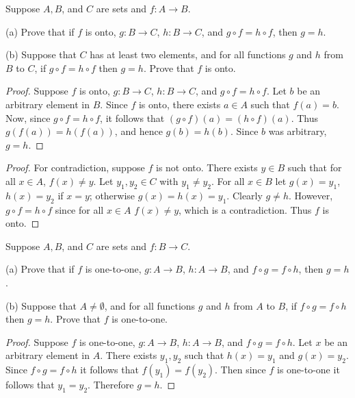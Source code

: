 \begin{tcolorbox}[title=Problem 20, breakable]
    Suppose $A, B$, and $C$ are sets and $f : A \rightarrow B$.

    (a) Prove that if $f$ is onto, $g : B \rightarrow C$, 
        $h : B \rightarrow C$, and $g \circ f = h \circ f$,
        then $g = h$.

    (b) Suppose that $C$ has at least two elements,
        and for all functions $g$ and $h$ from $B$ to $C$,
        if $g \circ f = h \circ f$ then $g = h$.
        Prove that $f$ is onto.
\end{tcolorbox}

\begin{proof}
    Suppose $f$ is onto, $g : B \rightarrow C$, 
        $h : B \rightarrow C$, and $g \circ f = h \circ f$.
    Let $b$ be an arbitrary element in $B$.
    Since $f$ is onto, there exists $a \in A$ such that $f(a) = b$.
    Now, since $g \circ f = h \circ f$, it follows that
        $(g \circ f)(a) = (h \circ f)(a)$.
    Thus $g(f(a)) = h(f(a))$, and hence $g(b) = h(b)$.
    Since $b$ was arbitrary, $g = h$.
\end{proof}

\begin{proof}
    For contradiction, suppose $f$ is not onto.
    There exists $y \in B$ such that for all $x \in A$,
        $f(x) \ne y$.
    Let $y_1, y_2 \in C$ with $y_1 \ne y_2$.
    For all $x \in B$ let 
        $g(x) = y_1$, $h(x) = y_2$ if $x = y$; otherwise $g(x) = h(x) = y_1$.
    Clearly $g \ne h$.
    However, $g \circ f = h \circ f$ since for all $x \in A$
        $f(x) \ne y$, which is a contradiction.
    Thus $f$ is onto.
\end{proof}

\begin{tcolorbox}[title=Problem 21, breakable]
     Suppose $A, B$, and $C$ are sets and $f : B \rightarrow C$.

     (a) Prove that if $f$ is one-to-one, $g : A \rightarrow B$,
         $h : A \rightarrow B$, and $f \circ g = f \circ h$, then $g = h$.

    (b) Suppose that $A \ne \emptyset$, and for all functions $g$ and $h$
        from $A$ to $B$, if $f \circ g = f \circ h$ then $g = h$.
        Prove that $f$ is one-to-one.
\end{tcolorbox}

\begin{proof}
    Suppose $f$ is one-to-one, $g : A \rightarrow B$,
         $h : A \rightarrow B$, and $f \circ g = f \circ h$.
    Let $x$ be an arbitrary element in $A$.
    There exists $y_1, y_2$ such that $h(x) = y_1$ 
        and $g(x) = y_2$.
    Since $f \circ g = f \circ h$ it 
        follows that $f(y_1) = f(y_2)$.
    Then since $f$ is one-to-one it follows that $y_1 = y_2$.
    Therefore $g = h$. 
\end{proof}

